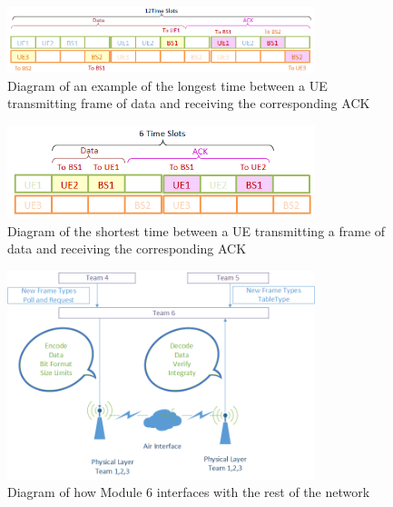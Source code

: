 \begin{figure}[p]
    \centering
    \includegraphics[width=0.8\textwidth]{ACK_timeout_long.PNG}
    \caption{Diagram of an example of the longest time between a UE transmitting frame of data and receiving the corresponding ACK}
    \label{fig:ACKtimelong}
\end{figure}

\begin{figure}[p]
    \centering
    \includegraphics[width=0.8\textwidth]{ACK_timeout_short.PNG}
    \caption{Diagram of the shortest time between a UE transmitting a frame of data and receiving the corresponding ACK}
    \label{fig:ACKtimeshort}
\end{figure}

\begin{figure}[p]
    \centering
    \includegraphics[width=0.8\textwidth]{Interface_diagram.PNG}
    \caption{Diagram of how Module 6 interfaces with the rest of the network}
    \label{fig:Interface}
\end{figure}